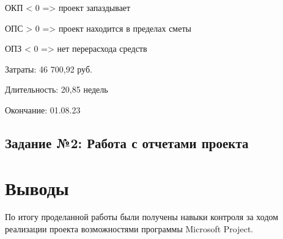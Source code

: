 \noindent ОКП < 0 => проект запаздывает

\noindent ОПС > 0 => проект находится в пределах сметы

\noindent ОПЗ < 0 => нет перерасхода средств

\noindent Затраты: 46 700,92 руб.

\noindent Длительность: 20,85 недель

\noindent Окончание: 01.08.23

\subsection*{Задание №2: Работа с отчетами проекта}


\section*{Выводы}


По итогу проделанной работы были получены навыки контроля за ходом реализации проекта возможностями программы Microsoft Project.